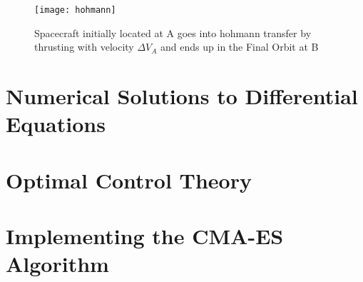 	\begin{figure}
		\centering
		\texttt{[image: hohmann]}
		\label{fig:hohmann}
		\caption{Spacecraft initially located at A goes into hohmann transfer by thrusting with velocity $\Delta V_A$ and ends up in the Final Orbit at B}
	\end{figure}
\section{Numerical Solutions to Differential Equations}
\section{Optimal Control Theory}
\section{Implementing the CMA-ES Algorithm}
